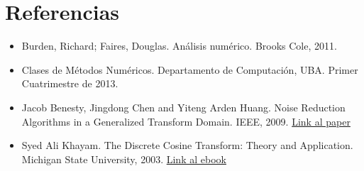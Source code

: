 \section{Referencias}

\begin{itemize}
  \item \nocite {Burden} Burden, Richard; Faires, Douglas. An\'alisis 
num\'erico. Brooks Cole, 2011.
  \item \nocite {MN} Clases de M\'etodos Num\'ericos. Departamento de 
Computaci\'on, UBA. Primer Cuatrimestre de 2013.
\item \nocite {MN} Jacob Benesty, Jingdong Chen and Yiteng Arden Huang. Noise Reduction Algorithms in a Generalized Transform Domain.
IEEE, 2009.
\href{http://externe.emt.inrs.ca/users/benesty/papers/aslp_aug2009.pdf}{Link al
paper}
\item \nocite {DCT} Syed Ali Khayam. The Discrete Cosine Transform: Theory and Application. Michigan State University, 2003.
    \href{http://www.cse.iitd.ernet.in/~pkalra/siv864/assignment2/DCT-TR802.pdf}{Link al ebook}
\end{itemize}
